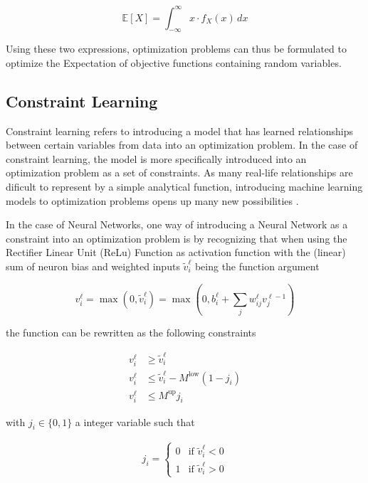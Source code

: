 \documentclass[preprint,12pt]{elsarticle}
\begin{document}
\[
\mathbb{E}[X] = \int_{-\infty}^{\infty} x \cdot f_X(x) \, dx
\]

Using these two expressions, optimization problems can thus be formulated to optimize the Expectation of objective functions containing random variables. \cite{BirgeLouveauxStochasticProgramming}


\subsection{Constraint Learning} \label{sec:constraint_learning}

Constraint learning refers to introducing a model that has learned relationships between certain variables from data into an optimization problem. In the case of constraint learning, the model is more specifically introduced into an optimization problem as a set of constraints. As many real-life relationships are dificult to represent by a simple analytical function, introducing machine learning models to optimization problems opens up many new possibilities \cite{FAJEMISIN20241}.

In the case of Neural Networks, one way of introducing a Neural Network as a constraint into an optimization problem is by recognizing that when using the Rectifier Linear Unit (ReLu) Function as activation function with the (linear) sum of neuron bias and weighted inputs $\tilde{v}_i^\ell$ being the function argument


\begin{equation}
	v_i^\ell = \max(0, \tilde{v}_i^\ell) = \max(0,  b_i^\ell + \sum_j w_{ij}^\ell v_j^{\ell - 1})
\end{equation}


the function can be rewritten as the following constraints 

\begin{align}
	v_i^\ell &\geq \tilde{v}_i^\ell \\
	v_i^\ell &\leq \tilde{v}_i^\ell - M^{\text{low}}(1 - j_i) \\
	v_i^\ell &\leq M^{\text{up}} j_i
\end{align}

with $j_i \in \{0,1\}$ a integer variable such that

\begin{align}
	j_i =
	\begin{cases}
		0 & \text{if } \tilde{v}_i^\ell < 0 \\
		1 & \text{if } \tilde{v}_i^\ell > 0
	\end{cases}
\end{align}
\end{document}
